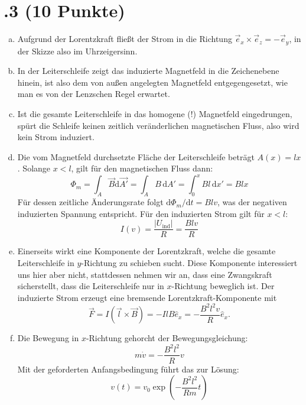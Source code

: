\section*{\nr.3 \titthree (10 Punkte)}
\begin{enumerate}[(a)]
\item Aufgrund der Lorentzkraft fließt der Strom in die Richtung $\vec{e}_x \times \vec{e}_z =-\vec{e}_y$, in der Skizze also im Uhrzeigersinn.
\item In der Leiterschleife zeigt das induzierte Magnetfeld in die Zeichenebene hinein, ist also dem von außen angelegten Magnetfeld entgegengesetzt, wie man es von der Lenzschen Regel erwartet.
\item Ist die gesamte Leiterschleife in das homogene (!) Magnetfeld eingedrungen, spürt die Schleife keinen zeitlich veränderlichen magnetischen Fluss, also wird kein Strom induziert.

\item Die vom Magnetfeld durchsetzte Fläche der Leiterschleife beträgt $A(x)=lx$. Solange $x<l$, gilt für den magnetischen Fluss dann:
\begin{equation}
\Phi_m = \int_A \vec{B}\mathrm{d}\vec{A'} = \int_A B\,\mathrm{d}A'=\int_0^{x} Bl\, \mathrm{d}x' = B l x
\end{equation}
Für dessen zeitliche Änderungsrate folgt $\mathrm{d}\Phi_m /\mathrm{d}t = Blv$, was der negativen induzierten Spannung entspricht. Für den induzierten Strom gilt für $x<l$:
\begin{equation}
I (v) = \frac{|U_\text{ind}|}{R} = \frac{Blv}{R}
\end{equation}
\item Einerseits wirkt eine Komponente der Lorentzkraft, welche die gesamte Leiterschleife in $y$-Richtung zu schieben sucht. Diese Komponente interessiert uns hier aber nicht, stattdessen nehmen wir an, dass eine Zwangskraft sicherstellt, dass die Leiterschleife nur in $x$-Richtung beweglich ist. Der induzierte Strom erzeugt eine bremsende Lorentzkraft-Komponente mit
\begin{equation}
\vec{F} = I (\vec{l} \times \vec{B})=-IlB \hat{e}_x =  -\frac{B^2l^2v}{R} \hat{e}_x.
\end{equation}

\item Die Bewegung in $x$-Richtung gehorcht der Bewegungsgleichung:
\begin{equation}
m \dot{v} = -\frac{B^2l^2}{R}v
\end{equation}
Mit der geforderten Anfangsbedingung führt das zur Lösung:
\begin{equation}
v(t) = v_0 \exp{\left(-\frac{B^2l^2}{Rm}t \right)}
\end{equation}
\end{enumerate}